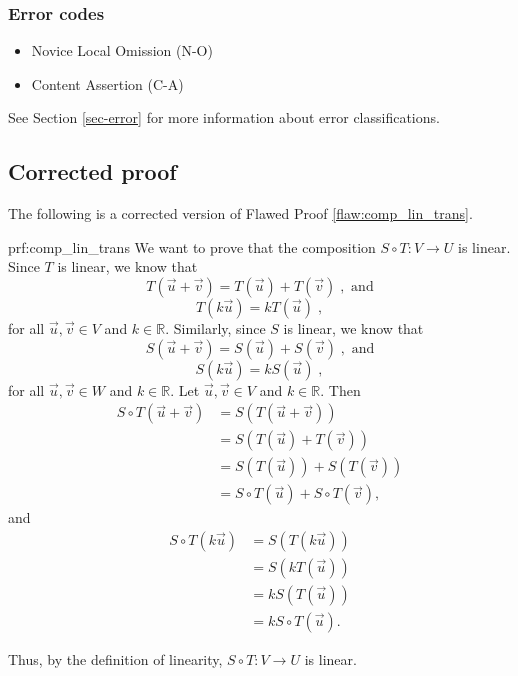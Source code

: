 \subsubsection{Error codes}
\begin{itemize}
	\item 	Novice Local Omission (N-O)
	\item   Content Assertion (C-A)
\end{itemize}
See Section \ref{sec-error} for more information about error classifications.

\clearpage
\subsection{Corrected proof}

The following is a corrected version of Flawed Proof \ref{flaw:comp_lin_trans}. %

\begin{prf}{prf:comp_lin_trans} %
We want to prove that the composition $S \circ T: V \rightarrow U$ is linear. Since $T$ is linear, we know that
$$T(\vec{u} + \vec{v}) = T(\vec{u}) + T(\vec{v}) \;,\text{ and}$$
$$T(k\vec{u}) = kT(\vec{u})\;,$$
for all $\vec{u}, \vec{v} \in V$ and $k\in \mathbb{R}.$
Similarly, since $S$ is linear, we know that
$$S(\vec{u} + \vec{v}) = S(\vec{u}) + S(\vec{v}) \;,\text{ and}$$
$$S(k\vec{u}) = kS(\vec{u})\;,$$
for all $\vec{u}, \vec{v} \in W$ and $k\in \mathbb{R}.$
Let $\vec{u}, \vec{v} \in V$ and $k \in \mathbb{R}.$ Then
\begin{align*}
    S \circ T(\vec{u} + \vec{v}) &= S(T(\vec{u} + \vec{v})) \\
    &= S(T(\vec{u}) + T(\vec{v})) \\
    &= S(T(\vec{u})) + S(T(\vec{v}))\\
    &= S \circ T(\vec{u}) + S \circ T(\vec{v}),
\end{align*}
and
\begin{align*}
    S \circ T(k\vec{u}) &= S(T(k\vec{u})) \\
    &= S(kT(\vec{u})) \\
    &= kS(T(\vec{u})) \\
    &= kS \circ T(\vec{u}).
\end{align*}

\noindent Thus, by the definition of linearity, $S \circ T: V \rightarrow U$ is linear.
\end{prf}
